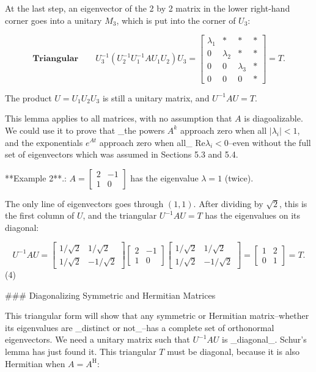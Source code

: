 At the last step, an eigenvector of the 2 by 2 matrix in the lower right-hand corner goes into a unitary \(M_{3}\), which is put into the corner of \(U_{3}\):

\[\textbf{Triangular}\qquad U_{3}^{-1}\left(U_{2}^{-1}U_{1}^{-1}AU_{1}U_{2} \right)U_{3}=\begin{bmatrix}\lambda_{1}&*&*&*\\ 0&\lambda_{2}&*&*\\ 0&0&\lambda_{3}&*\\ 0&0&0&*\end{bmatrix}=T.\]

The product \(U=U_{1}U_{2}U_{3}\) is still a unitary matrix, and \(U^{-1}AU=T\). 

This lemma applies to all matrices, with no assumption that \(A\) is diagoalizable. We could use it to prove that _the powers \(A^{k}\) approach zero when all \(|\lambda_{i}|<1\), and the exponentials \(e^{At}\) approach zero when all_ Re\(\lambda_{i}<0\)--even without the full set of eigenvectors which was assumed in Sections 5.3 and 5.4.

**Example 2**.: \(A=\begin{bmatrix}2&-1\\ 1&0\end{bmatrix}\) has the eigenvalue \(\lambda=1\) (twice).

The only line of eigenvectors goes through \((1,1)\). After dividing by \(\sqrt{2}\), this is the first column of \(U\), and the triangular \(U^{-1}AU=T\) has the eigenvalues on its diagonal:

\[U^{-1}AU=\begin{bmatrix}1/\sqrt{2}&1/\sqrt{2}\\ 1/\sqrt{2}&-1/\sqrt{2}\end{bmatrix}\begin{bmatrix}2&-1\\ 1&0\end{bmatrix}\begin{bmatrix}1/\sqrt{2}&1/\sqrt{2}\\ 1/\sqrt{2}&-1/\sqrt{2}\end{bmatrix}=\begin{bmatrix}1&2\\ 0&1\end{bmatrix}=T.\] (4)

### Diagonalizing Symmetric and Hermitian Matrices

This triangular form will show that any symmetric or Hermitian matrix--whether its eigenvalues are _distinct or not_--has a complete set of orthonormal eigenvectors. We need a unitary matrix such that \(U^{-1}AU\) is _diagonal_. Schur's lemma has just found it. This triangular \(T\) must be diagonal, because it is also Hermitian when \(A=A^{\mathrm{H}}\):

